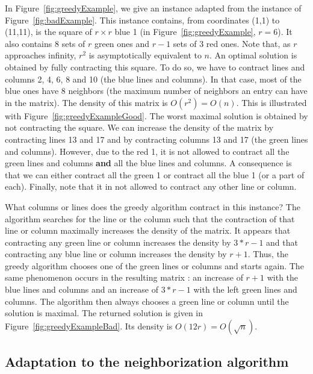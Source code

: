 In Figure~\ref{fig:greedyExample}, we give an instance adapted from the instance of Figure~\ref{fig:badExample}. This instance contains, from coordinates (1,1) to (11,11), is the square of $r \times r$ blue 1 (in Figure~\ref{fig:greedyExample}, $r = 6$). It also contains $8$ sets of $r$ green ones and $r-1$ sets of $3$ red ones. Note that, as $r$ approaches infinity, $r^2$ is asymptotically equivalent to $n$. An optimal solution is obtained by fully contracting this square. To do so, we have to contract lines and columns 2, 4, 6, 8 and 10 (the blue lines and columns). In that case, most of the blue ones have 8 neighbors (the maximum number of neighbors an entry can have in the matrix). The density of this matrix is $O(r^2) = O(n)$. This is illustrated with Figure~\ref{fig:greedyExampleGood}. The worst maximal solution is obtained by not contracting the square. We can increase the density of the matrix by contracting lines 13 and 17 and by contracting columns 13 and 17 (the green lines and columns). However, due to the red 1, it is not allowed to contract all the green lines and columns \textbf{and} all the blue lines and columns. A consequence is that we can either contract all the green 1 or contract all the blue 1 (or a part of each). Finally, note that it in not allowed to contract any other line or column.

What columns or lines does the greedy algorithm contract in this instance? The algorithm searches for the line or the column such that the contraction of that line or column maximally increases the density of the matrix. It appears that contracting any green line or column increases the density by $3 * r - 1$ and that contracting any blue line or column increases the density by $r+1$. Thus, the greedy algorithm chooses one of the green lines or columns and starts again. The same phenomenon occurs in the resulting matrix : an increase of $r+1$ with the blue lines and columns and an increase of $3 * r - 1$ with the left green lines and columns. The algorithm then always chooses a green line or column until the solution is maximal. The returned solution is given in Figure~\ref{fig:greedyExampleBad}. Its density is $O(12r) = O(\sqrt{n})$. 



\renewcommand{\gridsize}{0.5}




\subsection{Adaptation to the neighborization algorithm}

